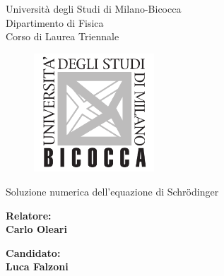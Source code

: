 \documentclass[12pt]{report}
\begin{document}
\begin{titlepage}
\begin{center}
    {\LARGE{Università degli Studi di Milano-Bicocca \\}}
    {\small{Dipartimento di Fisica}}\\
    {\small{Corso di Laurea Triennale}}
\end{center}
    
\begin{figure}[H]
    \centering
    \includegraphics[width=0.4\textwidth]{logo.png}
\end{figure}

\vspace{0.5cm}


\begin{center}
    {\huge {Soluzione numerica dell'equazione di Schr\"odinger}}
\end{center}

\vspace{2cm}

\begin{minipage}[t]{0.47\textwidth}
	{\large{\bf Relatore:\\ Carlo Oleari}}
\end{minipage}\hfill\begin{minipage}[t]{0.47\textwidth}\raggedleft
	{\large{\bf Candidato: \\Luca Falzoni\\ }}
\end{minipage}

\vspace{25mm}

\end{titlepage}


\begin{spacing}{1.4}
    \tableofcontents
\end{spacing} 
\thispagestyle{empty}
\end{document}
